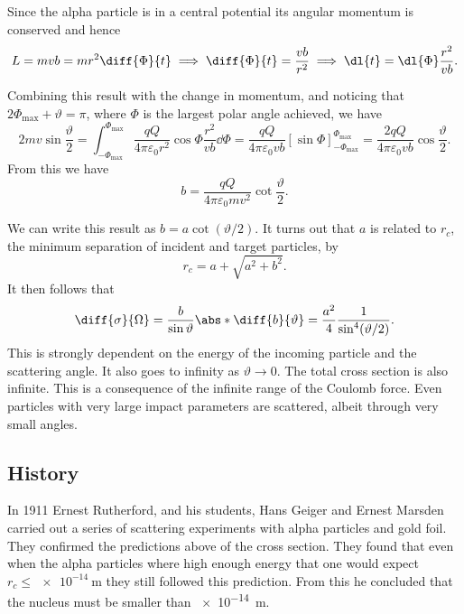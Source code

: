     Since the alpha particle is in a central potential its angular momentum is conserved and hence
    \begin{equation}
        L = mvb = mr^2\diff{\Phi}{t} \implies \diff{\Phi}{t} = \frac{vb}{r^2} \implies \dl{t} = \dl{\Phi}\frac{r^2}{vb}.
    \end{equation}
    
    Combining this result with the change in momentum, and noticing that \(2\Phi_{\max} + \vartheta = \pi\), where \(\Phi\) is the largest polar angle achieved, we have
    \begin{equation}
        2mv\sin\frac{\vartheta}{2} = \int_{-\Phi_{\max}}^{\Phi_{\max}} \frac{qQ}{4\pi\varepsilon_0r^2}\cos\Phi \frac{r^2}{vb} \dd{\Phi} = \frac{qQ}{4\pi\varepsilon_0vb}[\sin\Phi]_{-\Phi_{\max}}^{\Phi_{\max}} = \frac{2qQ}{4\pi\varepsilon_0vb}\cos\frac{\vartheta}{2}.
    \end{equation}
    From this we have
    \begin{equation}
        b = \frac{qQ}{4\pi\varepsilon_0mv^2}\cot\frac{\vartheta}{2}.
    \end{equation}
    
    We can write this result as \(b = a\cot(\vartheta/2)\).
    It turns out that \(a\) is related to \(r_c\), the minimum separation of incident and target particles, by
    \begin{equation}
        r_c = a + \sqrt{a^2 + b^2}.
    \end{equation}
    It then follows that
    \begin{equation}
        \diff{\sigma}{\Omega} = \frac{b}{\sin\vartheta} \abs*{\diff{b}{\vartheta}} = \frac{a^2}{4} \frac{1}{\sin^4(\vartheta/2)}.
    \end{equation}
    This is strongly dependent on the energy of the incoming particle and the scattering angle.
    It also goes to infinity as \(\vartheta \to 0\).
    The total cross section is also infinite.
    This is a consequence of the infinite range of the Coulomb force.
    Even particles with very large impact parameters are scattered, albeit through very small angles.
    
    \subsection{History}
    In 1911 Ernest Rutherford, and his students, Hans Geiger and Ernest Marsden carried out a series of scattering experiments with alpha particles and gold foil.
    They confirmed the predictions above of the cross section.
    They found that even when the alpha particles where high enough energy that one would expect \(r_c \le \qty{e-14}{\metre}\) they still followed this prediction.
    From this he concluded that the nucleus must be smaller than \qty{e-14}{\metre}.
    
